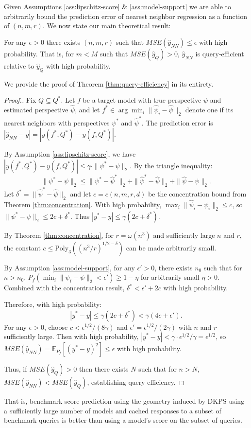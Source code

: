 Given Assumptions \ref{ass:lipschitz-score} \& \ref{ass:model-support} we are able to arbitrarily bound the prediction error of nearest neighbor regression as a function of $(n, m, r)$.
We now state our main theoretical result:
\begin{theorem}
\label{thm:query-efficiency}
    For any $ \epsilon > 0 $ there exists $ (n,m,r) $ such that 
    $ MSE(\hat{y}_{NN}) \le \epsilon $
    with high probability.
    That is, for $ m < M $ such that $ MSE(\hat{y}_{Q}) > 0 $, $ \hat{y}_{NN} $ is query-efficient relative to $ \hat{y}_{Q} $ with high probability. 
\end{theorem}
We provide the proof of Theorem \ref{thm:query-efficiency} in its entirety.
\begin{proof}[Proof.]
Fix $ Q \subseteq Q^{*} $. 
Let $f$ be a target model with true perspective $\psi$ and estimated perspective $\widehat{\psi}$, and let $f^* \in \arg\min_{i} \|\widehat{\psi}_i - \widehat{\psi}\|_2$ denote one if its nearest neighbors with perspectives $\psi^*$ and $\widehat{\psi}^*$. The prediction error is $|\hat{y}_{NN} - y| = |y(f^*, Q^*) - y(f, Q^*)|$.

By Assumption \ref{ass:lipschitz-score}, we have $|y(f^*, Q^*) - y(f, Q^*)| \leq \gamma \cdot \|\psi^* - \psi\|_2$. 
By the triangle inequality:
\begin{equation*}
\|\psi^* - \psi\|_2 \leq \|\psi^* - \widehat{\psi}^*\|_2 + \|\widehat{\psi}^* - \widehat{\psi}\|_2 + \|\widehat{\psi} - \psi\|_2.
\end{equation*}
Let $\delta^* = \|\widehat{\psi}^* - \widehat{\psi}\|_2$ and let $c = c(n,m,r,d)$ be the concentration bound from Theorem \ref{thm:concentration}. With high probability, $\max_i \|\widehat{\psi}_i - \psi_i\|_2 \leq c$, so $\|\psi^* - \psi\|_2 \leq 2c + \delta^*$. Thus $|y^* - y| \leq \gamma(2c + \delta^*)$.

By Theorem \ref{thm:concentration}, for $r = \omega(n^3)$ and sufficiently large $n $ and $ r$, the constant $c \leq \text{Poly}_3(({n^3}/{r})^{{1}/{2}-\delta})$ can be made arbitrarily small. 

By Assumption \ref{ass:model-support}, for any $\epsilon' > 0$, there exists $n_0$ such that for $n > n_0$, $P_f(\min_i \|\psi_i - \psi\|_2 < \epsilon') \geq 1 - \eta$ for arbitrarily small $\eta > 0$. Combined with the concentration result, $\delta^* < \epsilon' + 2c$ with high probability.

Therefore, with high probability:
\begin{equation*}
|y^* - y| \leq \gamma(2c + \delta^*) < \gamma(4c + \epsilon').
\end{equation*}
For any $\epsilon > 0$, choose $c < \epsilon^{1/2}/(8\gamma)$ and $\epsilon' = \epsilon^{1/2}/(2\gamma)$ with $ n $ and $ r $ sufficiently large.
Then with high probability, $|y^* - y| < \gamma \cdot \epsilon^{1/2}/\gamma = \epsilon^{1/2}$, so $MSE(\hat{y}_{NN}) = \mathbb{E}_{P_f}[(y^* - y)^2] \leq \epsilon$ with high probability.

Thus, if $MSE(\hat{y}_{Q}) > 0$ then there exists $N$ such that for $n > N$, $MSE(\hat{y}_{NN}) < MSE(\hat{y}_{Q})$, establishing query-efficiency.
\end{proof}

That is, benchmark score prediction using the geometry induced by DKPS using a sufficiently large number of models and cached responses to a subset of benchmark queries is better than using a model’s score on the subset of queries.